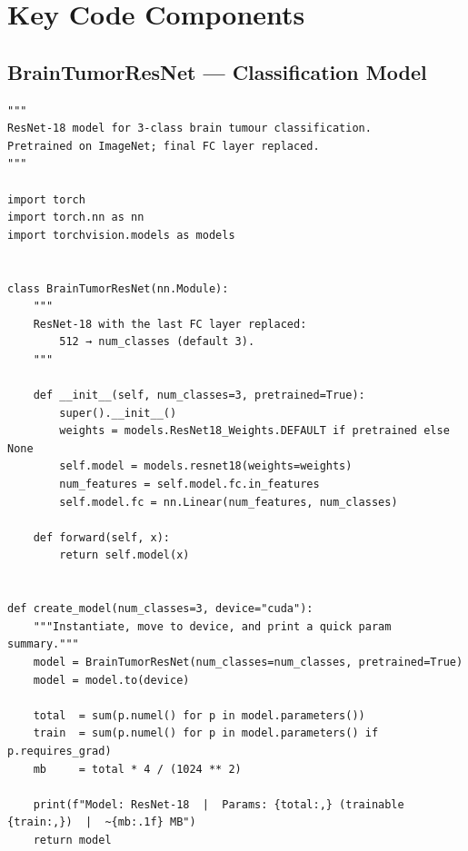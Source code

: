 \section{Key Code Components}

\subsection{BrainTumorResNet --- Classification Model}
\begin{lstlisting}[caption={ResNet-18 Brain Tumor Classifier (model.py)}, label={lst:model}]
"""
ResNet-18 model for 3-class brain tumour classification.
Pretrained on ImageNet; final FC layer replaced.
"""

import torch
import torch.nn as nn
import torchvision.models as models


class BrainTumorResNet(nn.Module):
    """
    ResNet-18 with the last FC layer replaced:
        512 → num_classes (default 3).
    """

    def __init__(self, num_classes=3, pretrained=True):
        super().__init__()
        weights = models.ResNet18_Weights.DEFAULT if pretrained else None
        self.model = models.resnet18(weights=weights)
        num_features = self.model.fc.in_features
        self.model.fc = nn.Linear(num_features, num_classes)

    def forward(self, x):
        return self.model(x)


def create_model(num_classes=3, device="cuda"):
    """Instantiate, move to device, and print a quick param summary."""
    model = BrainTumorResNet(num_classes=num_classes, pretrained=True)
    model = model.to(device)

    total  = sum(p.numel() for p in model.parameters())
    train  = sum(p.numel() for p in model.parameters() if p.requires_grad)
    mb     = total * 4 / (1024 ** 2)

    print(f"Model: ResNet-18  |  Params: {total:,} (trainable {train:,})  |  ~{mb:.1f} MB")
    return model
\end{lstlisting}

